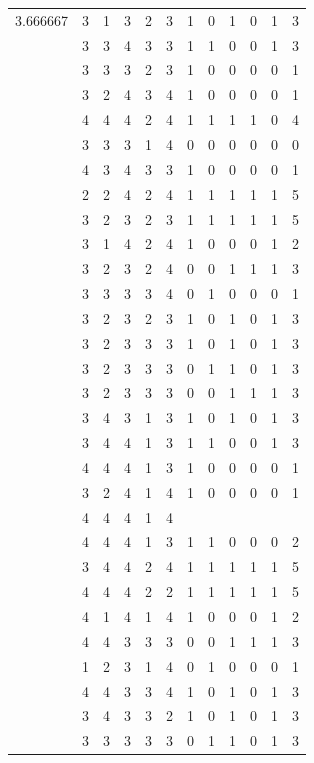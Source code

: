 \documentclass[]{book}
\theoremstyle{definition}
\theoremstyle{definition}
\theoremstyle{definition}
\theoremstyle{remark}
\begin{document}
\begin{table}
{\begin{tabular}[t]{rrrrrrrrrrrr}
3.666667 & 3 & 1 & 3 & 2 & 3 & 1 & 0 & 1 & 0 & 1 & 3\\
 & 3 & 3 & 4 & 3 & 3 & 1 & 1 & 0 & 0 & 1 & 3\\
 & 3 & 3 & 3 & 2 & 3 & 1 & 0 & 0 & 0 & 0 & 1\\
 & 3 & 2 & 4 & 3 & 4 & 1 & 0 & 0 & 0 & 0 & 1\\
 & 4 & 4 & 4 & 2 & 4 & 1 & 1 & 1 & 1 & 0 & 4\\
 & 3 & 3 & 3 & 1 & 4 & 0 & 0 & 0 & 0 & 0 & 0\\
 & 4 & 3 & 4 & 3 & 3 & 1 & 0 & 0 & 0 & 0 & 1\\
 & 2 & 2 & 4 & 2 & 4 & 1 & 1 & 1 & 1 & 1 & 5\\
 & 3 & 2 & 3 & 2 & 3 & 1 & 1 & 1 & 1 & 1 & 5\\
 & 3 & 1 & 4 & 2 & 4 & 1 & 0 & 0 & 0 & 1 & 2\\
 & 3 & 2 & 3 & 2 & 4 & 0 & 0 & 1 & 1 & 1 & 3\\
 & 3 & 3 & 3 & 3 & 4 & 0 & 1 & 0 & 0 & 0 & 1\\
 & 3 & 2 & 3 & 2 & 3 & 1 & 0 & 1 & 0 & 1 & 3\\
 & 3 & 2 & 3 & 3 & 3 & 1 & 0 & 1 & 0 & 1 & 3\\
 & 3 & 2 & 3 & 3 & 3 & 0 & 1 & 1 & 0 & 1 & 3\\
 & 3 & 2 & 3 & 3 & 3 & 0 & 0 & 1 & 1 & 1 & 3\\
 & 3 & 4 & 3 & 1 & 3 & 1 & 0 & 1 & 0 & 1 & 3\\
 & 3 & 4 & 4 & 1 & 3 & 1 & 1 & 0 & 0 & 1 & 3\\
 & 4 & 4 & 4 & 1 & 3 & 1 & 0 & 0 & 0 & 0 & 1\\
 & 3 & 2 & 4 & 1 & 4 & 1 & 0 & 0 & 0 & 0 & 1\\
 & 4 & 4 & 4 & 1 & 4 &  &  &  &  &  & \\
 & 4 & 4 & 4 & 1 & 3 & 1 & 1 & 0 & 0 & 0 & 2\\
 & 3 & 4 & 4 & 2 & 4 & 1 & 1 & 1 & 1 & 1 & 5\\
 & 4 & 4 & 4 & 2 & 2 & 1 & 1 & 1 & 1 & 1 & 5\\
 & 4 & 1 & 4 & 1 & 4 & 1 & 0 & 0 & 0 & 1 & 2\\
 & 4 & 4 & 3 & 3 & 3 & 0 & 0 & 1 & 1 & 1 & 3\\
 & 1 & 2 & 3 & 1 & 4 & 0 & 1 & 0 & 0 & 0 & 1\\
 & 4 & 4 & 3 & 3 & 4 & 1 & 0 & 1 & 0 & 1 & 3\\
 & 3 & 4 & 3 & 3 & 2 & 1 & 0 & 1 & 0 & 1 & 3\\
 & 3 & 3 & 3 & 3 & 3 & 0 & 1 & 1 & 0 & 1 & 3\\

\end{tabular}}
\end{table}
\end{document}

